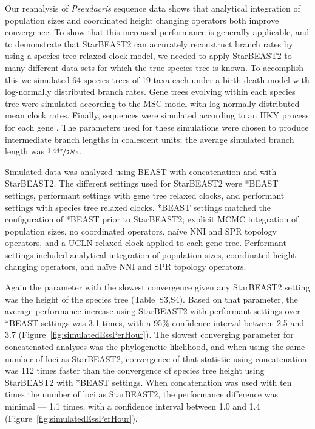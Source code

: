 \documentclass[12pt]{article}
\begin{document}
Our reanalysis of \textit{Pseudacris} sequence data shows that analytical
integration of population sizes and coordinated height changing operators both
improve convergence. To show that this increased performance is generally
applicable, and to demonstrate that StarBEAST2 can accurately reconstruct branch
rates by using a species tree relaxed clock model, we needed to apply StarBEAST2 to
many different data sets for which the true species tree is known. To accomplish
this we simulated 64 species trees of 19 taxa each under a birth-death model
with log-normally distributed branch rates. Gene trees evolving within each
species tree were simulated according to the MSC model with
log-normally distributed mean clock rates. Finally, sequences were simulated
according to an HKY process for each gene \citep{Hasegawa1985, Goldman1993}. The
parameters used for these simulations were chosen to produce intermediate
branch lengths in coalescent units; the average simulated branch length was
$\nicefrac{1.44\tau}{2Ne}$.

Simulated data was analyzed using BEAST with concatenation and with StarBEAST2.
The different settings used for StarBEAST2 were *BEAST settings, performant
settings with gene tree relaxed clocks, and performant settings with species
tree relaxed clocks. *BEAST settings matched the configuration of *BEAST prior
to StarBEAST2; explicit MCMC integration of population sizes, no coordinated
operators, na\"ive NNI and SPR topology operators, and a UCLN relaxed clock
applied to each gene tree. Performant settings included analytical integration of
population sizes, coordinated height changing operators, and na\"ive NNI and SPR
topology operators.

Again the parameter with the slowest convergence given any StarBEAST2 setting
was the height of the species tree (Table~S3,S4). Based on that parameter, the
average performance increase using StarBEAST2 with performant settings over
*BEAST settings was 3.1 times, with a 95\% confidence interval between 2.5 and
3.7 (Figure~\ref{fig:simulatedEssPerHour}). The slowest converging parameter for
concatenated analyses was the phylogenetic likelihood, and when using the same
number of loci as StarBEAST2, convergence of that statistic using concatenation
was 112 times faster than the convergence of species tree height using
StarBEAST2 with *BEAST settings. When concatenation was used with ten times the
number of loci as StarBEAST2, the performance difference was minimal --- 1.1
times, with a confidence interval between 1.0 and 1.4
(Figure~\ref{fig:simulatedEssPerHour}).
\end{document}
